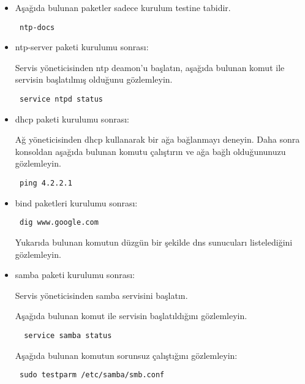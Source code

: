 \documentclass[a4paper,10pt]{article}
\begin{document}
\begin{itemize}
\item Aşağıda bulunan paketler sadece kurulum testine tabidir.

\begin{verbatim}
 ntp-docs
\end{verbatim}


\item ntp-server paketi kurulumu sonrası:

Servis yöneticisinden ntp deamon'u başlatın, aşağıda bulunan komut ile servisin başlatılmış olduğunu gözlemleyin.
\begin{verbatim}
 service ntpd status
\end{verbatim}


 \item dhcp paketi kurulumu sonrası:

Ağ yöneticisinden dhcp kullanarak bir ağa bağlanmayı deneyin. Daha sonra konsoldan aşağıda bulunan komutu çalıştırın ve ağa bağlı olduğununuzu gözlemleyin.
\begin{verbatim}
 ping 4.2.2.1
\end{verbatim}

\item bind paketleri kurulumu sonrası:
\begin{verbatim}
 dig www.google.com
\end{verbatim}
Yukarıda bulunan komutun düzgün bir şekilde dns sunucuları listelediğini gözlemleyin.

\item samba paketi kurulumu sonrası:

Servis yöneticisinden samba servisini başlatın.

Aşağıda bulunan komut ile servisin başlatıldığını gözlemleyin.
\begin{verbatim}
  service samba status 
\end{verbatim}

 Aşağıda bulunan komutun sorunsuz çalıştığını gözlemleyin:
\begin{verbatim}
 sudo testparm /etc/samba/smb.conf
\end{verbatim}

\end{itemize}
\end{document}
